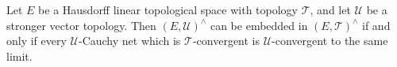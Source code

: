 Let $E$ be a Hausdorff linear topological space with topology $\mathcal{T}$, and let $\mathcal{U}$ be a stronger vector topology. Then $(E, \mathcal{U})^\wedge$ can be embedded in $(E, \mathcal{T})^\wedge$ if and only if every $\mathcal{U}$-Cauchy net which is $\mathcal{T}$-convergent is $\mathcal{U}$-convergent to the same limit.
